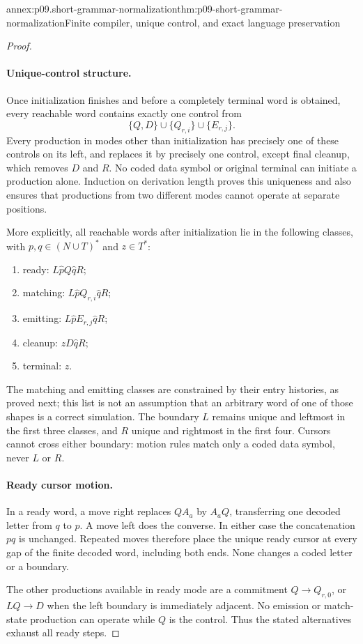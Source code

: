 \begin{annexitem}{annex:p09.short-grammar-normalization}{thm:p09-short-grammar-normalization}{Finite compiler, unique control, and exact language preservation}
\begin{proof}
\paragraph{Unique-control structure.}
Once initialization finishes and before a completely terminal word is
obtained, every reachable word contains exactly one control from
\[
 \{Q,D\}\cup\{Q_{r,i}\}\cup\{E_{r,j}\}.
\]
Every production in modes other than initialization has precisely one of
these controls on its left, and replaces it by precisely one control,
except final cleanup, which removes \(D\) and \(R\).
No coded data symbol or original terminal can initiate a production alone.
Induction on derivation length proves this uniqueness and also ensures that
productions from two different modes cannot operate at separate positions.

More explicitly, all reachable words after initialization lie in the
following classes, with \(p,q\in(N\cup T)^*\) and \(z\in T^*\):
\begin{enumerate}
\item ready: \(L\widehat pQ\widehat qR\);
\item matching: \(L\widehat pQ_{r,i}\widehat qR\);
\item emitting: \(L\widehat pE_{r,j}\widehat qR\);
\item cleanup: \(zD\widehat qR\);
\item terminal: \(z\).
\end{enumerate}
The matching and emitting classes are constrained by their entry histories,
as proved next; this list is not an assumption that an arbitrary word of
one of those shapes is a correct simulation. The boundary \(L\) remains
unique and leftmost in the first three classes, and \(R\) unique and
rightmost in the first four. Cursors cannot cross either boundary: motion
rules match only a coded data symbol, never \(L\) or \(R\).

\paragraph{Ready cursor motion.}
In a ready word, a move right replaces \(QA_a\) by \(A_aQ\), transferring
one decoded letter from \(q\) to \(p\). A move left does the converse.
In either case the concatenation \(pq\) is unchanged. Repeated moves
therefore place the unique ready cursor at every gap of the finite decoded
word, including both ends. None changes a coded letter or a boundary.

The other productions available in ready mode are a commitment
\(Q\to Q_{r,0}\), or \(LQ\to D\) when the left boundary is immediately
adjacent. No emission or match-state production can operate while \(Q\)
is the control. Thus the stated alternatives exhaust all ready steps.


\end{proof}
\end{annexitem}
